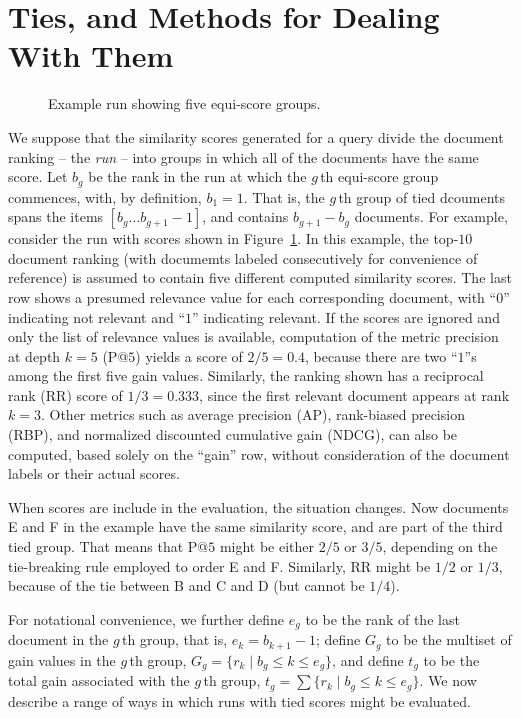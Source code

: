 \section{Ties, and Methods for Dealing With Them}
\label{sec-ties}


\begin{figure}[t]
\centering

\caption{Example run showing five equi-score groups.
\label{fig-example}}
\end{figure}

We suppose that the similarity scores generated for a query divide
the document ranking -- the {\emph{run}} -- into groups in which all
of the documents have the same score.
Let $b_g$ be the rank in the run at which the $g$\,th equi-score
group commences, with, by definition, $b_1=1$.
That is, the $g$\,th group of tied dcouments spans the items
$[b_g\ldots b_{g+1}-1]$, and contains $b_{g+1}-b_g$ documents.
For example, consider the run with scores shown in
Figure~\ref{fig-example}.
In this example, the top-$10$ document ranking (with documemts
labeled consecutively for convenience of reference) is assumed to
contain five different computed similarity scores.
The last row shows a presumed relevance value for each corresponding
document, with ``$0$'' indicating not relevant and ``$1$'' indicating
relevant.
If the scores are ignored and only the list of relevance values is
available, computation of the metric precision at depth $k=5$ (P@$5$)
yields a score of $2/5=0.4$, because there are two ``$1$''s among the
first five gain values.
Similarly, the ranking shown has a reciprocal rank (RR) score of
$1/3=0.333$, since the first relevant document appears at rank $k=3$.
Other metrics such as average precision (AP), rank-biased precision
(RBP), and normalized discounted cumulative gain (NDCG), can also be
computed, based solely on the ``gain'' row, without consideration of
the document labels or their actual scores.

When scores are include in the evaluation, the situation changes.
Now documents E and F in the example have the same similarity score,
and are part of the third tied group.
That means that P@$5$ might be either $2/5$ or $3/5$, depending on
the tie-breaking rule employed to order E and F.
Similarly, RR might be $1/2$ or $1/3$, because of the tie between B
and C and D (but cannot be $1/4$).

For notational convenience, we further define $e_g$ to be the rank of
the last document in the $g$\,th group, that is, $e_k=b_{k+1}-1$;
define $G_g$ to be the multiset of gain values in the $g$\,th group,
	$G_g =\{r_k\mid b_g \le k \le e_g\}$, 
and define $t_g$ to be the total gain associated with the $g$\,th
group,
	$t_g = \sum \{r_k\mid b_g \le k \le e_g\}$.
We now describe a range of ways in which runs with tied scores might
be evaluated.

